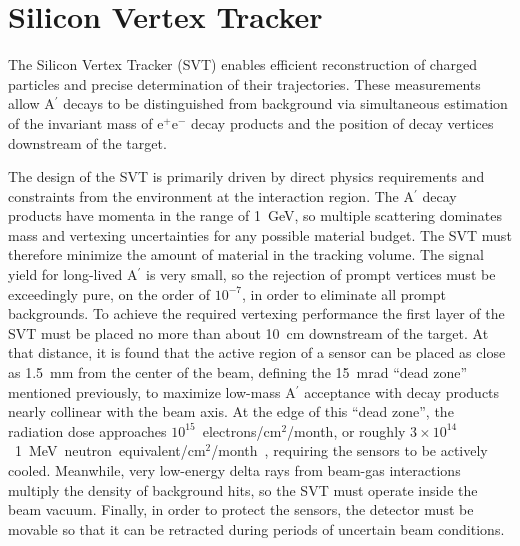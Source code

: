 \documentclass[final,3p,times,twocolumn]{elsarticle}
\newcommand{\Aprime}{A\ensuremath{^\prime}}
\newcommand{\ee}{e$^+$e$^-$}
\newcommand{\fluenceunit}{1~MeV~neutron~equivalent/cm\ensuremath{^2}}
\begin{document}

\section{Silicon Vertex Tracker}
\label{svt}

The Silicon Vertex Tracker (SVT) enables efficient reconstruction of charged particles and precise 
determination of their trajectories. These measurements allow \Aprime{} decays to be distinguished 
from background via simultaneous estimation of the invariant mass of \ee{} decay products and the 
position of decay vertices downstream of the target. 

The design of the SVT is primarily driven by direct physics requirements and constraints from the 
environment at the interaction region. The \Aprime{} decay products 
have momenta in the range of 1~GeV, so multiple scattering dominates mass and vertexing 
uncertainties for any possible material budget. The SVT must therefore minimize the amount of 
material in the tracking volume. The signal yield for long-lived \Aprime{} is very small, so 
the rejection of prompt vertices must be exceedingly pure, on the order of $10^{-7}$, in order to 
eliminate all prompt backgrounds. To achieve the required vertexing performance the first layer of the 
SVT must be placed no more than about 10~cm downstream of the target. At that distance, it is found 
that the active region of a sensor can be placed as close as 1.5~mm from the center of the beam, 
defining the 15~mrad ``dead zone'' mentioned previously, to maximize low-mass \Aprime{} acceptance 
with decay products nearly collinear with the beam axis. At the edge of this ``dead zone'', the 
radiation dose approaches $10^{15}$~electrons/cm$^2$/month, or roughly 
$3 \times 10^{14}$~\fluenceunit{}/month~\cite{Rashevskaya:2002nd}, 
requiring the sensors to be actively cooled.
Meanwhile, very low-energy delta rays from 
beam-gas interactions multiply the density of background hits, so the SVT must operate inside the 
beam vacuum.  Finally, in order to protect the sensors, the detector must be movable so that it can be 
retracted during periods of uncertain beam conditions.  
\end{document}
